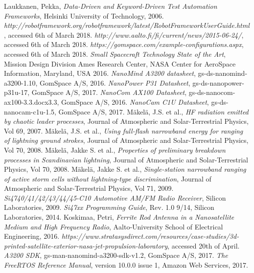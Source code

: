 \documentclass[english,12pt,a4paper,pdftex,elec,utf8]{aaltothesis}
\begin{document}
\begin{thebibliography}{99}
 Laukkanen, Pekka,
  \textit{Data-Driven and Keyword-Driven Test Automation Frameworks}, Helsinki University of Technology, 2006.
  \textit{http://robotframework.org/robotframework/latest/RobotFrameworkUserGuide.html}, accessed 6th of March 2018.  
  \textit{http://www.aalto.fi/fi/current/news/2015-06-24/}, accessed 6th of March 2018.
  \textit{https://gomspace.com/example-configurations.aspx}, accessed 6th of March 2018.
  \textit{Small Spacecraft Technology State of the Art}, Mission Design Division 
Ames Research Center, NASA Center for AeroSpace Information, Maryland, USA 2016.
  \textit{NanoMind A3200 datasheet}, gs-ds-nanomind-a3200-1.10, GomSpace A/S, 2016.
  \textit{NanoPower P31 Datasheet}, gs-ds-nanopower-p31u-17, GomSpace A/S, 2017.
  \textit{NanoCom AX100 Datasheet}, gs-ds-nanocom-ax100-3.3.docx3.3, GomSpace A/S, 2016.
  \textit{NanoCam C1U Datasheet}, gs-ds-nanocam-c1u-1.5, GomSpace A/S, 2017.
 Mäkelä, J.S. et al.,
  \textit{HF radiation emitted by chaotic leader processes}, Journal of Atmospheric and Solar-Terrestrial Physics, Vol 69, 2007.  
 Mäkelä, J.S. et al.,
  \textit{Using full-flash narrowband energy for ranging of lightning
ground strokes}, Journal of Atmospheric and Solar-Terrestrial Physics, Vol 70, 2008.  
 Mäkelä, Jakke S. et al.,
  \textit{Properties of preliminary breakdown processes in
Scandinavian lightning}, Journal of Atmospheric and Solar-Terrestrial Physics, Vol 70, 2008.
 Mäkelä, Jakke S. et al.,
  \textit{Single-station narrowband ranging of active storm cells without
lightning-type discrimination}, Journal of Atmospheric and Solar-Terrestrial Physics, Vol 71, 2009.
  \textit{Si4740/41/42/43/44/45-C10 Automotive AM/FM Radio
Receiver}, Silicon Laboratories, 2009.
  \textit{Si47xx Programming Guide}, Rev. 1.0 9/14, Silicon Laboratories, 2014.
 Koskimaa, Petri,
  \textit{Ferrite Rod Antenna in a Nanosatellite Medium and High Frequency Radio}, Aalto-University School of Electrical Engineering, 2016.
  \textit{https://www.stratasysdirect.com/resources/case-studies/3d-printed-satellite-exterior-nasa-jet-propulsion-laboratory}, accessed 20th of April.
  \textit{A3200 SDK}, gs-man-nanomind-a3200-sdk-v1.2, GomSpace A/S, 2017.
  \textit{The FreeRTOS Reference Manual}, version 10.0.0 issue 1, Amazon Web Services, 2017.

\end{thebibliography}
\end{document}
